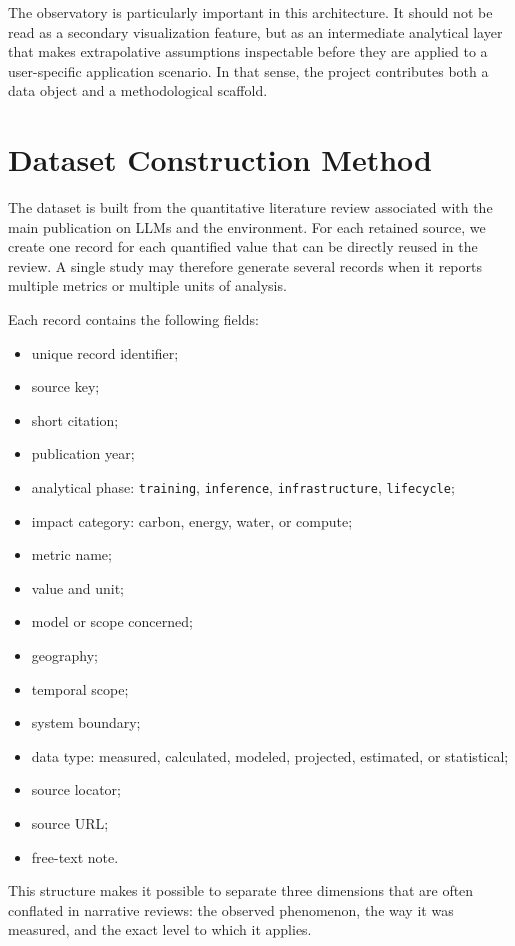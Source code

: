 \documentclass[11pt,a4paper]{article}
\begin{document}
The observatory is particularly important in this architecture. It should not be read as a secondary visualization feature, but as an intermediate analytical layer that makes extrapolative assumptions inspectable before they are applied to a user-specific application scenario. In that sense, the project contributes both a data object and a methodological scaffold.

\section{Dataset Construction Method}
The dataset is built from the quantitative literature review associated with the main publication on LLMs and the environment. For each retained source, we create one record for each quantified value that can be directly reused in the review. A single study may therefore generate several records when it reports multiple metrics or multiple units of analysis.

Each record contains the following fields:
\begin{itemize}
\item unique record identifier;
\item source key;
\item short citation;
\item publication year;
\item analytical phase: \texttt{training}, \texttt{inference}, \texttt{infrastructure}, \texttt{lifecycle};
\item impact category: carbon, energy, water, or compute;
\item metric name;
\item value and unit;
\item model or scope concerned;
\item geography;
\item temporal scope;
\item system boundary;
\item data type: measured, calculated, modeled, projected, estimated, or statistical;
\item source locator;
\item source URL;
\item free-text note.
\end{itemize}

This structure makes it possible to separate three dimensions that are often conflated in narrative reviews: the observed phenomenon, the way it was measured, and the exact level to which it applies.
\end{document}

